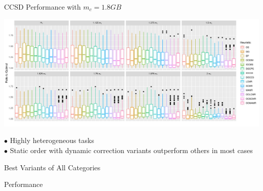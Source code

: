 \documentclass[mathserif,hyperref={pdfpagemode=FullScreen}]{beamer}
\begin{document}
\begin{frame}{CCSD Performance with $m_c=1.8GB$}
\begin{center}
	\includegraphics[width=1.05\linewidth]{./diagrams/results/ratio_to_optimal_selected_ccsd.pdf}
\end{center}
$\bullet$ Highly heterogeneous tasks\\
$\bullet$ Static order with dynamic correction variants outperform others in most cases
\end{frame}

\begin{frame}{Best Variants of All Categories}
\begin{block}{  Performance}
	\begin{center}
	\end{center}
\end{block}
\end{frame}
\end{document}
